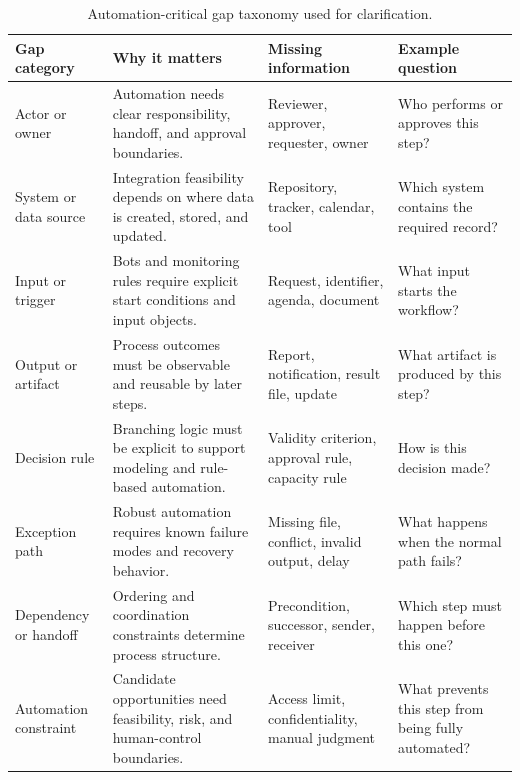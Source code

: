 \begin{table}[!t]
\caption{Automation-critical gap taxonomy used for clarification.}
\label{tab:gap-taxonomy}
\footnotesize
\setlength{\tabcolsep}{3pt}
\renewcommand{\arraystretch}{0.94}
\begin{tabular}{p{}p{}p{}p{}}
\toprule
\textbf{Gap category} & \textbf{Why it matters} & \textbf{Missing information} & \textbf{Example question} \\
\midrule
Actor or owner &
Automation needs clear responsibility, handoff, and approval boundaries. &
Reviewer, approver, requester, owner &
Who performs or approves this step? \\
\midrule
System or data source &
Integration feasibility depends on where data is created, stored, and updated. &
Repository, tracker, calendar, tool &
Which system contains the required record? \\
\midrule
Input or trigger &
Bots and monitoring rules require explicit start conditions and input objects. &
Request, identifier, agenda, document &
What input starts the workflow? \\
\midrule
Output or artifact &
Process outcomes must be observable and reusable by later steps. &
Report, notification, result file, update &
What artifact is produced by this step? \\
\midrule
Decision rule &
Branching logic must be explicit to support modeling and rule-based automation. &
Validity criterion, approval rule, capacity rule &
How is this decision made? \\
\midrule
Exception path &
Robust automation requires known failure modes and recovery behavior. &
Missing file, conflict, invalid output, delay &
What happens when the normal path fails? \\
\midrule
Dependency or handoff &
Ordering and coordination constraints determine process structure. &
Precondition, successor, sender, receiver &
Which step must happen before this one? \\
\midrule
Automation constraint &
Candidate opportunities need feasibility, risk, and human-control boundaries. &
Access limit, confidentiality, manual judgment &
What prevents this step from being fully automated? \\
\bottomrule
\end{tabular}
\end{table}
